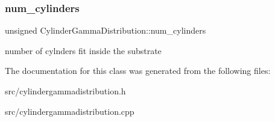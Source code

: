 \subsubsection{\texorpdfstring{num\+\_\+cylinders}{num\_cylinders}}
{\footnotesize\ttfamily unsigned Cylinder\+Gamma\+Distribution\+::num\+\_\+cylinders}

number of cylnders fit inside the substrate 

The documentation for this class was generated from the following files\+:\begin{DoxyCompactItemize}
\item 
src/cylindergammadistribution.\+h\item 
src/cylindergammadistribution.\+cpp\end{DoxyCompactItemize}

